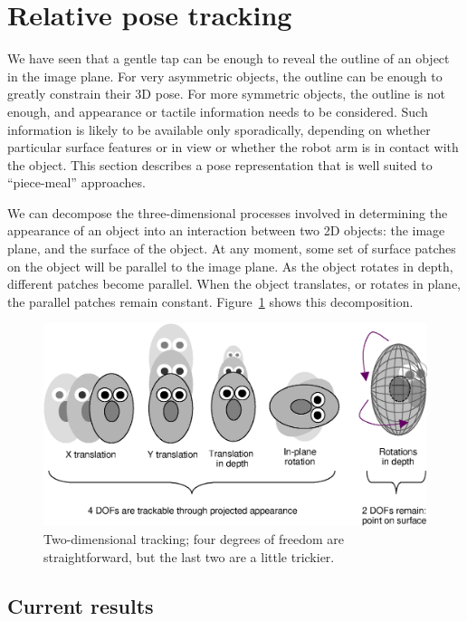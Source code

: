 
\newcommand{\dgrs}{$^{\circ}$}

\section{Relative pose tracking}

We have seen that a gentle tap can be enough to reveal the outline of
an object in the image plane.  For very asymmetric objects, the
outline can be enough to greatly constrain their 3D pose.  For more
symmetric objects, the outline is not enough, and appearance or
tactile information needs to be considered.  Such information is
likely to be available only sporadically, depending on whether particular
surface features or in view or whether the robot arm is in contact
with the object.  This section describes a pose representation
that is well suited to ``piece-meal'' approaches.

We can decompose the three-dimensional processes involved in
determining the appearance of an object into an interaction between
two 2D objects: the image plane, and the surface of the object.  At
any moment, some set of surface patches on the object will be parallel
to the image plane.  As the object rotates in depth, different patches
become parallel.  When the object translates, or rotates in plane, the
parallel patches remain constant.  Figure~\ref{fig:tracking-dofs}
shows this decomposition.

\begin{figure}[tbp]
\centerline{\includegraphics[width=\columnwidth]{tracking-dofs.eps}}
\caption{ 
%
  Two-dimensional tracking; four degrees of freedom are straightforward,
  but the last two are a little trickier.
%
}
\label{fig:tracking-dofs}
\end{figure}


\subsection{Current results}

